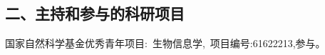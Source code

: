 \vspace{22pt}
\subsection*{二、主持和参与的科研项目}
\ifblindreview
\else
\begin{enumerate}[label={[\arabic*]},itemindent=2em,wide]

    \item 国家自然科学基金优秀青年项目:~生物信息学,~项目编号:61622213,参与。

\end{enumerate}

\fi

\newpage

\ifblindreview
\else

\newpage
\fi